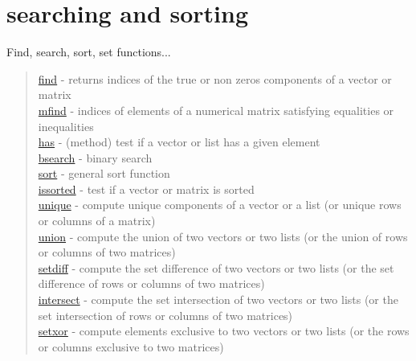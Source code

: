 \chapter*{searching and sorting}
\hypertarget{searchandsort}{}
Find, search, sort, set functions...

\begin{quote}
\noindent
\hyperlink{find}{find} - returns indices of the true or non zeros
components of a vector or matrix \\
\hyperlink{mfind}{mfind} - indices of elements of a numerical matrix satisfying equalities or inequalities\\
\hyperlink{has}{has} - (method) test if a vector or list has a given element\\
\hyperlink{bsearch}{bsearch} - binary search \\
\hyperlink{sort}{sort} - general sort function \\
\hyperlink{issorted}{issorted} - test if a vector or matrix is sorted \\
\hyperlink{unique}{unique} - compute unique components of a vector or a list (or unique rows or columns of a matrix) \\
\hyperlink{union}{union} - compute the union of two vectors or two lists (or the union of rows or columns of two matrices) \\
\hyperlink{setdiff}{setdiff} - compute the set difference of two vectors or two lists (or the set difference of rows or columns of two matrices) \\
\hyperlink{intersect}{intersect} - compute the set intersection of two vectors or two lists  (or the set intersection of rows or columns of two matrices)\\
\hyperlink{setxor}{setxor} - compute elements exclusive to two vectors or two lists (or the rows or columns exclusive to two matrices)\\
\end{quote}

 
 
 
 
 

 
 
 
  
 
